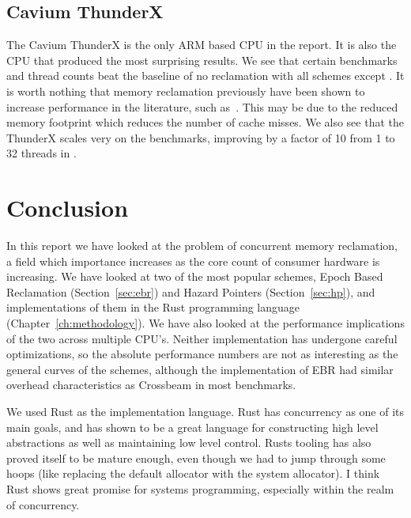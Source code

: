 \documentclass[b5paper]{report}
\begin{document}

\clearpage
\section{Cavium ThunderX}

The Cavium ThunderX is the only ARM based CPU in the report. It is also the CPU
that produced the most surprising results. We see that certain benchmarks and
thread counts beat the baseline of no reclamation with all schemes except
. It is worth nothing that memory reclamation previously have been
shown to increase performance in the literature, such as\
\cite{brown2015reclaiming}. This may be due to the reduced memory footprint
which reduces the number of cache misses. We also see that the ThunderX scales
very on the \code{List} benchmarks, improving by a factor of 10 from 1 to 32
threads in \code{List::Remove}.



\chapter{Conclusion\label{ch:conclusion}}

In this report we have looked at the problem of concurrent memory reclamation, a
field which importance increases as the core count of consumer hardware is
increasing. We have looked at two of the most popular schemes, Epoch Based
Reclamation (Section~\ref{sec:ebr}) and Hazard Pointers (Section~\ref{sec:hp}),
and implementations of them in the Rust programming language
(Chapter~\ref{ch:methodology}). We have also looked at the performance
implications of the two across multiple CPU's.  Neither implementation has
undergone careful optimizations, so the absolute performance numbers are not as
interesting as the general curves of the schemes, although the implementation of
EBR had similar overhead characteristics as Crossbeam in most benchmarks.

We used Rust as the implementation language. Rust has concurrency as one of its
main goals, and has shown to be a great language for constructing high level
abstractions as well as maintaining low level control. Rusts tooling has also
proved itself to be mature enough, even though we had to jump through some hoops
(like replacing the default allocator with the system allocator). I think Rust
shows great promise for systems programming, especially within the realm of
concurrency.
\end{document}
